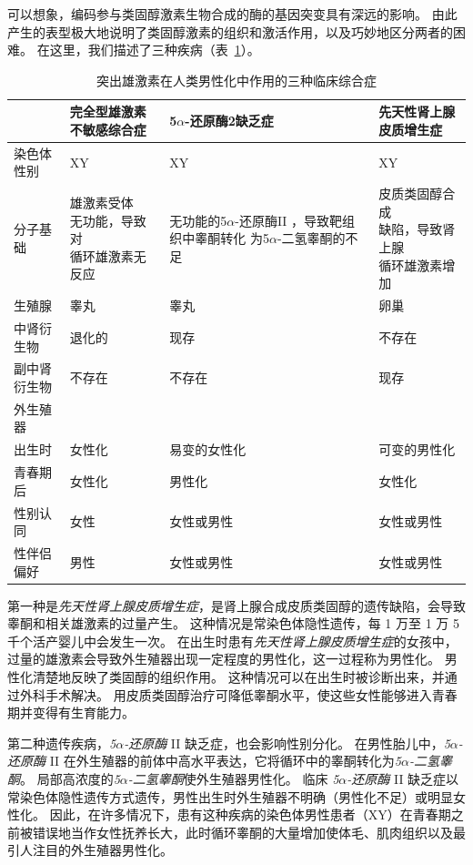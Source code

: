 可以想象，编码参与类固醇激素生物合成的酶的基因突变具有深远的影响。
由此产生的表型极大地说明了类固醇激素的组织和激活作用，以及巧妙地区分两者的困难。
在这里，我们描述了三种疾病（表~\ref{tab:51_1}）。


\begin{table}[htbp]
	\caption{突出雄激素在人类男性化中作用的三种临床综合症} \label{tab:51_1} \centering
	\begin{tabular}{llll}
		\toprule
		 & 完全型雄激素不敏感综合症 & 5$\alpha$-还原酶2缺乏症 & 先天性肾上腺皮质增生症\\
		\midrule
		染色体性别 & XY & XY & XY \\
		分子基础 & \makecell[l]{雄激素受体\\无功能，导致对\\循环雄激素无反应} & \makecell[l]{无功能的5$\alpha$-还原酶II\\，导致靶组织中睾酮转化\\为5$\alpha$-二氢睾酮的不足} & \makecell[l]{皮质类固醇合成\\缺陷，导致肾上腺\\循环雄激素增加} \\
		生殖腺 & 睾丸 & 睾丸 & 卵巢 \\
		中肾衍生物 & 退化的 & 现存 & 不存在 \\
		副中肾衍生物 & 不存在 & 不存在 & 现存 \\
		外生殖器 &  &  &  \\
		出生时 & 女性化 & 易变的女性化 & 可变的男性化 \\
		青春期后 & 女性化 & 男性化 & 女性化 \\
		性别认同 & 女性 & 女性或男性 & 女性或男性 \\
		性伴侣偏好 & 男性 & 女性或男性 & 女性或男性 \\
		\bottomrule
	\end{tabular}
\end{table}


第一种是\textit{先天性肾上腺皮质增生症}，是肾上腺合成皮质类固醇的遗传缺陷，会导致睾酮和相关雄激素的过量产生。
这种情况是常染色体隐性遗传，每 1 万至 1 万 5 千个活产婴儿中会发生一次。
在出生时患有\textit{先天性肾上腺皮质增生症}的女孩中，过量的雄激素会导致外生殖器出现一定程度的男性化，这一过程称为男性化。
男性化清楚地反映了类固醇的组织作用。
这种情况可以在出生时被诊断出来，并通过外科手术解决。
用皮质类固醇治疗可降低睾酮水平，使这些女性能够进入青春期并变得有生育能力。


第二种遗传疾病，\textit{5$\alpha$-还原酶} II 缺乏症，也会影响性别分化。
在男性胎儿中，\textit{5$\alpha$-还原酶} II 在外生殖器的前体中高水平表达，它将循环中的睾酮转化为\textit{5$\alpha$-二氢睾酮}。
局部高浓度的\textit{5$\alpha$-二氢睾酮}使外生殖器男性化。
临床 \textit{5$\alpha$-还原酶} II 缺乏症以常染色体隐性遗传方式遗传，男性出生时外生殖器不明确（男性化不足）或明显女性化。
因此，在许多情况下，患有这种疾病的染色体男性患者（XY）在青春期之前被错误地当作女性抚养长大，此时循环睾酮的大量增加使体毛、肌肉组织以及最引人注目的外生殖器男性化。


